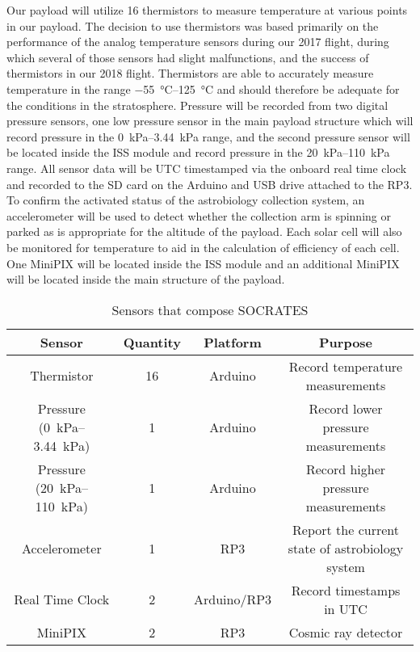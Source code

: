 Our payload will utilize 16 thermistors to measure temperature at various points in our payload. The decision to use thermistors was based primarily on the performance of the analog temperature sensors during our 2017 flight, during which several of those sensors had slight malfunctions, and the success of thermistors in our 2018 flight. Thermistors are able to accurately measure temperature in the range \SIrange{-55}{125}{\celsius} and should therefore be adequate for the conditions in the stratosphere. Pressure will be recorded from two digital pressure sensors, one low pressure sensor in the main payload structure which will record pressure in the \SIrange{0}{3.44}{\kilo\pascal} range, and the second pressure sensor will be located inside the ISS module and record pressure in the \SIrange{20}{110}{\kilo\pascal} range. All sensor data will be UTC timestamped via the onboard real time clock and recorded to the SD card on the Arduino and USB drive attached to the RP3. To confirm the activated status of the astrobiology collection system, an accelerometer will be used to detect whether the collection arm is spinning or parked as is appropriate for the altitude of the payload. Each solar cell will also be monitored for temperature to aid in the calculation of efficiency of each cell. One MiniPIX will be located inside the ISS module and an additional MiniPIX will be located inside the main structure of the payload.

\begin{table}[h!]
\centering
\caption{Sensors that compose SOCRATES}
\label{tab:Sensors}
\bigskip
\begin{tabular}{cccc}
  \hline
  \hline
  \multicolumn{1}{c}{\bfseries Sensor} & {\bfseries Quantity} & {\bfseries Platform} & {\bfseries Purpose} \\
  \hline
  Thermistor          		& 16 & Arduino  		& Record temperature measurements  \\
  Pressure (\SIrange{0}{3.44}{\kilo\pascal})        				& 1 & Arduino 		& Record lower pressure measurements \\
  Pressure (\SIrange{20}{110}{\kilo\pascal})        				& 1 & Arduino 		& Record higher pressure measurements \\
  Accelerometer       		& 1 & RP3    		& Report the current state of astrobiology system \\
  Real Time Clock 				& 2 & Arduino/RP3 	& Record timestamps in UTC \\
  MiniPIX         				& 2 & RP3     		& Cosmic ray detector \\
  \hline
  \hline
\end{tabular}
\end{table}


